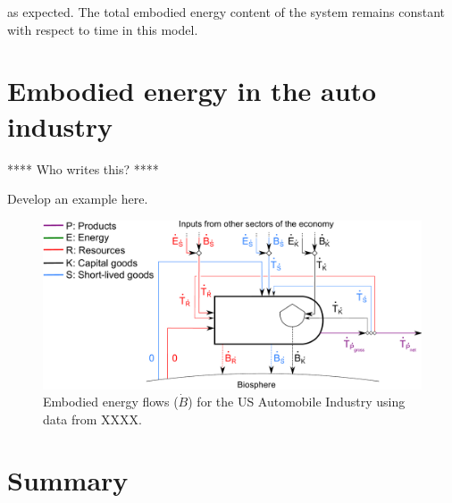 \noindent{}as expected. The total embodied energy content of the system 
remains constant with respect to time in this model.


\section{Embodied energy in the auto industry}
\label{sec:embodied_energy_auto}

**** Who writes this? ****

Develop an example here. 


\begin{figure}[!ht]
\centering
\includegraphics[width=0.8\linewidth]{Part_1/Chapter_Embodied/images/PERKS_basic_unit_embodied_energy_content_auto_ind.pdf}
\caption[Embodied energy flows for the US Automobile Industry]{Embodied energy flows ($\dot{B}$) for the US Automobile Industry using data from XXXX.}
\label{fig:PERKS_embodied_auto}
\end{figure}

\section{Summary}
\label{sec:embodied_energy_summary}








